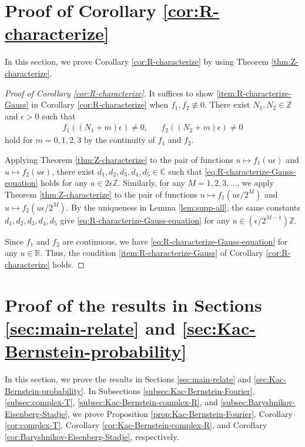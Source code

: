 \documentclass[12pt]{article}
\theoremstyle{definition}
\theoremstyle{remark}
\numberwithin{equation}{section}
\numberwithin{figure}{section}
\numberwithin{table}{section}
\begin{document}
\section{Proof of Corollary \ref{cor:R-characterize}}
\label{sec:R-characterize-proof}

In this section, we prove Corollary \ref{cor:R-characterize} by using Theorem \ref{thm:Z-characterize}.

\begin{proof}[Proof of Corollary \ref{cor:R-characterize}]

It suffices to show \ref{item:R-characterize-Gauss} in Corollary \ref{cor:R-characterize} when $ f_1 , f_2 \not\equiv 0 $.
There exist $ N_1 , N_2 \in \mathbb{ Z } $ and $ \epsilon > 0 $ such that
\begin{align}
    f_1 ( ( N_1 + m ) \epsilon ) \neq 0, & &
    f_2 ( ( N_2 + m ) \epsilon ) \neq 0
\end{align}
hold for $ m = 0 , 1 , 2 , 3 $ by the continuity of $ f_1 $ and $ f_2 $.

Applying Theorem \ref{thm:Z-characterize} to the pair of functions $ u \mapsto f_1 ( u \epsilon ) $ and $ u \mapsto f_2 ( u \epsilon ) $, there exist $ d_1 , d_2 , d_3 , d_4 , d_5 \in \mathbb{ C } $ such that \eqref{eq:R-characterize-Gauss-equation} holds for any $ u \in 2 \epsilon \mathbb{ Z } $.
Similarly, for any $ M = 1 , 2 , 3 , \ldots $, we apply Theorem \ref{thm:Z-characterize} to the pair of functions $ u \mapsto f_1 ( u \epsilon / 2^M ) $ and $ u \mapsto f_2 ( u \epsilon / 2^M ) $.
By the uniqueness in Lemma \ref{lem:supp-all}, the same constants $ d_1 , d_2 , d_3 , d_4 , d_5 $ give \eqref{eq:R-characterize-Gauss-equation} for any $ u \in ( \epsilon / 2^{ M - 1 } ) \mathbb{ Z } $.

Since $ f_1 $ and $ f_2 $ are continuous, we have \eqref{eq:R-characterize-Gauss-equation} for any $ u \in \mathbb{ R } $.
Thus, the condition \ref{item:R-characterize-Gauss} of Corollary \ref{cor:R-characterize} holds.
\end{proof}

\section{Proof of the results in Sections \ref{sec:main-relate} and \ref{sec:Kac-Bernstein-probability}}
\label{sec:in-main-relate-proof}

In this section, we prove the results in Sections \ref{sec:main-relate} and \ref{sec:Kac-Bernstein-probability}.
In Subsections \ref{subsec:Kac-Bernstein-Fourier}, \ref{subsec:complex-T}, \ref{subsec:Kac-Bernstein-complex-R}, and \ref{subsec:Baryshnikov-Eisenberg-Stadje}, we prove Proposition \ref{prop:Kac-Bernstein-Fourier}, Corollary \ref{cor:complex-T}, Corollary \ref{cor:Kac-Bernstein-complex-R}, and Corollary \ref{cor:Baryshnikov-Eisenberg-Stadje}, respectively.
\end{document}
